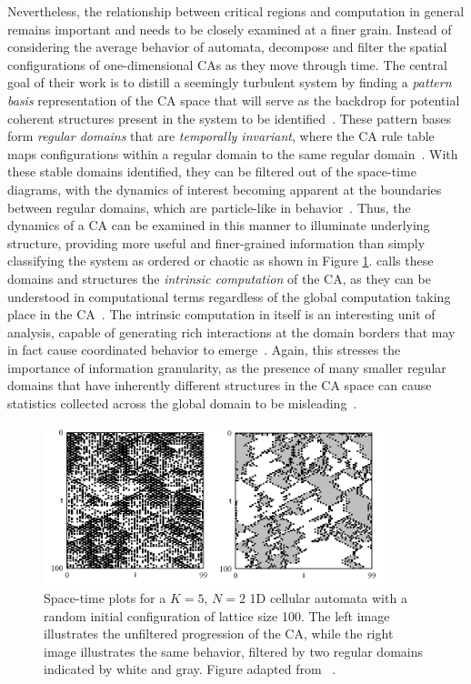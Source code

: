 \documentclass[a4paper,11pt,twoside]{report}
\begin{document}
Nevertheless, the relationship between critical regions and computation in general remains important and needs to be closely examined at a finer grain. Instead of considering the average behavior of automata, \citeauthor{cr93} decompose and filter the spatial configurations of one-dimensional CAs as they move through time. The central goal of their work is to distill a seemingly turbulent system by finding a \textit{pattern basis} representation of the CA space that will serve as the backdrop for potential coherent structures present in the system to be identified~\cite{cr93}. These pattern bases form \textit{regular domains} that are \textit{temporally invariant}, where the CA rule table maps configurations within a regular domain to the same regular domain~\cite{mi96}. With these stable domains identified, they can be filtered out of the space-time diagrams, with the dynamics of interest becoming apparent at the boundaries between regular domains, which are particle-like in behavior~\cite{cr93}. Thus, the dynamics of a CA can be examined in this manner to illuminate underlying structure, providing more useful and finer-grained information than simply classifying the system as ordered or chaotic as shown in Figure \ref{fig:ca_filter}. \citeauthor{cr93} calls these domains and structures the \textit{intrinsic computation} of the CA, as they can be understood in computational terms regardless of the global computation taking place in the CA~\cite{mi96}. The intrinsic computation in itself is an interesting unit of analysis, capable of generating rich interactions at the domain borders that may in fact cause coordinated behavior to emerge~\cite{cr95}. Again, this stresses the importance of information granularity, as the presence of many smaller regular domains that have inherently different structures in the CA space can cause statistics collected across the global domain to be misleading~\cite{cr93}.

\begin{figure}[htp]
\centering
\includegraphics[width=0.9\textwidth]{cr93_fig3.png}
\caption[Filtered CA Behavior]{
Space-time plots for a $K=5$, $N=2$ 1D cellular automata with a random initial configuration of lattice size 100. The left image illustrates the unfiltered progression of the CA, while the right image illustrates the same behavior, filtered by two regular domains indicated by white and gray. Figure adapted from \citeauthor{cr93}~\cite{cr93}.
}
\label{fig:ca_filter}
\end{figure}
\end{document}
